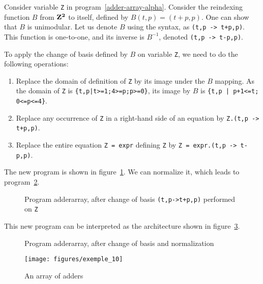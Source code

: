Consider variable {\tt Z} in program~\ref{adder-array-alpha}. Consider
the reindexing function $B$ from $\bf Z^2$ to itself, defined by $B(t,p)
= (t+p,p)$. One can show that $B$ is unimodular. Let us denote
$B$ using the {\alfa} syntax, as {\tt (t,p -> t+p,p)}. This function 
is one-to-one, and its inverse is $B^{-1}$, denoted {\tt (t,p -> t-p,p)}.

To apply the change of basis defined by $B$ on variable {\tt Z}, 
we need to do the following operations:
\begin{enumerate}
\item Replace the domain of definition of {\tt Z} by its image under
the $B$ mapping. As the domain of {\tt Z} is 
{\tt \{t,p|t>=1;4>=p;p>=0\}}, its image by $B$ is 
{\tt \{t,p | p+1<=t; 0<=p<=4\}}.
\item Replace any occurrence of {\tt Z} in a right-hand side of 
an equation by {\tt Z.(t,p -> t+p,p)}.
\item Replace the entire equation {\tt Z = expr} defining {\tt Z}
by {\tt Z = expr.(t,p -> t-p,p)}.
\end{enumerate}

The new program is shown in figure~\ref{adder-array-bn-alpha}. We can normalize
it, which leads to program~\ref{adder-array-cb-alpha}.
\begin{figure}[htbp]

\caption{Program adderarray, after change of basis {\tt (t,p->t+p,p)}
performed on {\tt Z}}\label{adder-array-bn-alpha}
\end{figure}

This new program can be interpreted as the architecture shown in 
figure~\ref{adder-array-cb-tex}.
\begin{figure}[htbp]

\caption{Program adderarray, after change of basis 
and normalization}\label{adder-array-cb-alpha}
\end{figure}

\begin{figure}[htbp]
\centerline{\texttt{[image: figures/exemple\_10]}}
\caption{An array of adders}\label{adder-array-cb-tex}
\end{figure}

